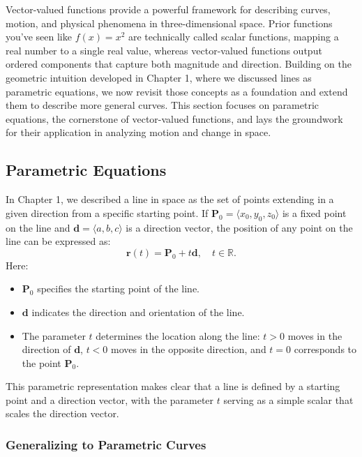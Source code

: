   

Vector-valued functions provide a powerful framework for describing curves, motion, and physical phenomena in three-dimensional space. Prior functions you've seen like $f(x) = x^2$ are technically called scalar functions, mapping a real number to a single real value, whereas vector-valued functions output ordered components that capture both magnitude and direction. Building on the geometric intuition developed in Chapter 1, where we discussed lines as parametric equations, we now revisit those concepts as a foundation and extend them to describe more general curves. This section focuses on parametric equations, the cornerstone of vector-valued functions, and lays the groundwork for their application in analyzing motion and change in space.

\subsection*{Parametric Equations} 

\noindent In Chapter 1, we described a line in space as the set of points extending in a given direction from a specific starting point. If \( \mathbf{P}_0 = \langle x_0, y_0, z_0 \rangle \) is a fixed point on the line and \( \mathbf{d} = \langle a, b, c \rangle \) is a direction vector, the position of any point on the line can be expressed as:
\[
\mathbf{r}(t) = \mathbf{P}_0 + t\mathbf{d}, \quad t \in \mathbb{R}.
\]
Here:
\begin{itemize}
    \item \( \mathbf{P}_0 \) specifies the starting point of the line.
    \item \( \mathbf{d} \) indicates the direction and orientation of the line.
    \item The parameter \( t \) determines the location along the line: \( t > 0 \) moves in the direction of \( \mathbf{d} \), \( t < 0 \) moves in the opposite direction, and \( t = 0 \) corresponds to the point \( \mathbf{P}_0 \).
\end{itemize}

\noindent This parametric representation makes clear that a line is defined by a starting point and a direction vector, with the parameter \( t \) serving as a simple scalar that scales the direction vector.

\subsubsection*{Generalizing to Parametric Curves}

